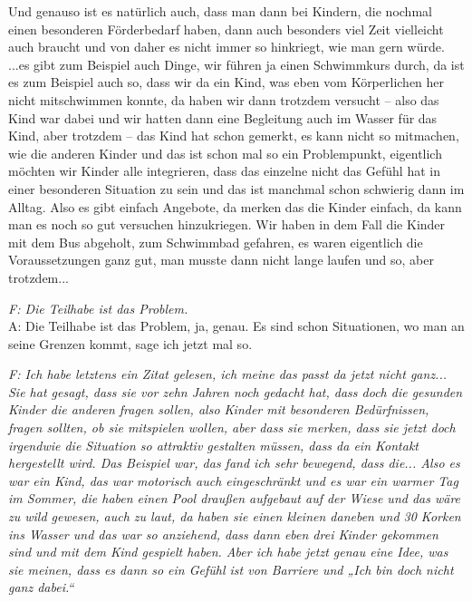 \begin{linenumbers*}
Und genauso ist es natürlich auch, dass man dann bei Kindern, die nochmal einen besonderen Förderbedarf haben, dann auch besonders viel Zeit vielleicht auch braucht und von daher es nicht immer so hinkriegt, wie man gern würde. ...es gibt zum Beispiel auch Dinge, wir führen ja einen Schwimmkurs durch, da ist es zum Beispiel auch so, dass wir da ein Kind, was eben vom Körperlichen her nicht mitschwimmen konnte, da haben wir dann trotzdem versucht – also das Kind war dabei und wir hatten dann eine Begleitung auch im Wasser für das Kind, aber trotzdem – das Kind hat schon gemerkt, es kann nicht so mitmachen, wie die anderen Kinder und das ist schon mal so ein Problempunkt, eigentlich möchten wir Kinder alle integrieren, dass das einzelne nicht das Gefühl hat in einer besonderen Situation zu sein und das ist manchmal schon schwierig dann im Alltag. Also es gibt einfach Angebote, da merken das die Kinder einfach, da kann man es noch so gut versuchen hinzukriegen. Wir haben in dem Fall die Kinder mit dem Bus abgeholt, zum Schwimmbad gefahren, es waren eigentlich die Voraussetzungen ganz gut, man musste dann nicht lange laufen und so, aber trotzdem...  

\emph{F: Die Teilhabe ist das Problem.}\\
A: Die Teilhabe ist das Problem, ja, genau. Es sind schon Situationen, wo man an seine Grenzen kommt, sage ich jetzt mal so.

\emph{F: Ich habe letztens ein Zitat gelesen, ich meine das passt da jetzt nicht ganz... Sie hat gesagt, dass sie vor zehn Jahren noch gedacht hat, dass doch die gesunden Kinder die anderen fragen sollen, also Kinder mit besonderen Bedürfnissen, fragen sollten, ob sie mitspielen wollen, aber dass sie merken, dass sie jetzt doch irgendwie die Situation so attraktiv gestalten müssen, dass da ein Kontakt hergestellt wird. Das Beispiel war, das fand ich sehr bewegend, dass die... Also es war ein Kind, das war motorisch auch eingeschränkt und es war ein warmer Tag im Sommer, die haben einen Pool draußen aufgebaut auf der Wiese und das wäre zu wild gewesen, auch zu laut, da haben sie einen kleinen daneben und 30 Korken ins Wasser und das war so anziehend, dass dann eben drei Kinder gekommen sind und mit dem Kind gespielt haben. Aber ich habe jetzt genau eine Idee, was sie meinen, dass es dann so ein Gefühl ist von Barriere und „Ich bin doch nicht ganz dabei.“} 


\end{linenumbers*}
